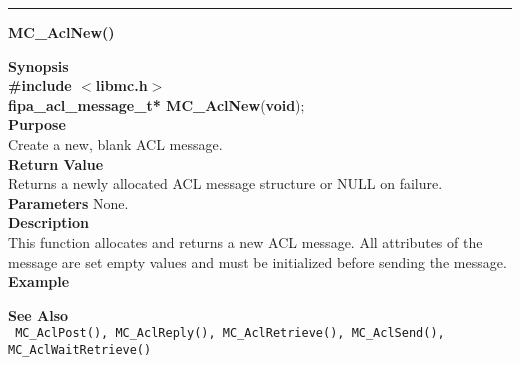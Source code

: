 \noindent
\vspace{5pt}
\rule{6.5in}{0.015in}
\noindent
{}
{\LARGE \bf MC\_AclNew()}\\
\label{api:MC_AclNew()}

\noindent
{\bf Synopsis}\\
{\bf \#include $<$libmc.h$>$}\\
{\bf fipa\_acl\_message\_t* MC\_AclNew}({\bf void});\\

\noindent
{\bf Purpose}\\
Create a new, blank ACL message.\\

\noindent
{\bf Return Value}\\
Returns a newly allocated ACL message structure or NULL on failure.\\

\noindent
{\bf Parameters}
None.\\

\noindent
{\bf Description}\\
This function allocates and returns a new ACL message. All 
attributes of the message are set empty values and must be 
initialized before sending the message.\\

\noindent
{\bf Example}\\
\noindent
{\footnotesize}

\noindent
{\bf See Also}\\
\texttt{
  MC\_AclPost(), MC\_AclReply(), MC\_AclRetrieve(), MC\_AclSend(), \linebreak
    MC\_AclWaitRetrieve()
}

